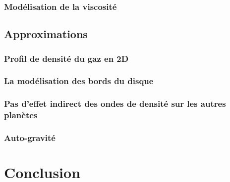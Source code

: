 \documentclass[a4paper,twoside]{report}
\begin{document}
\subsection{Modélisation de la viscosité}



\section{Approximations}
\subsection{Profil de densité du gaz en 2D}
\subsection{La modélisation des bords du disque}
\subsection{Pas d'effet indirect des ondes de densité sur les autres planètes}
\subsection{Auto-gravité}

\chapter*{Conclusion}



\end{document}
